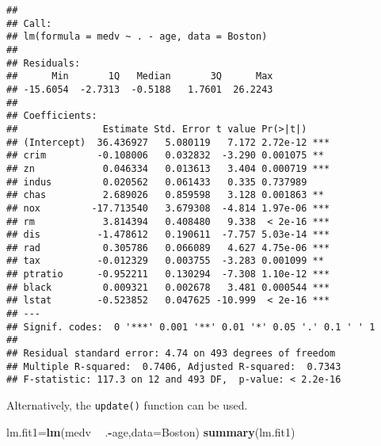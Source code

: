 \documentclass[]{article}
\newenvironment{Shaded}{\begin{snugshade}}{\end{snugshade}}
\newcommand{\KeywordTok}[1]{\textcolor[rgb]{0.13,0.29,0.53}{\textbf{#1}}}
\newcommand{\DataTypeTok}[1]{\textcolor[rgb]{0.13,0.29,0.53}{#1}}
\newcommand{\StringTok}[1]{\textcolor[rgb]{0.31,0.60,0.02}{#1}}
\newcommand{\OperatorTok}[1]{\textcolor[rgb]{0.81,0.36,0.00}{\textbf{#1}}}
\newcommand{\NormalTok}[1]{#1}
\begin{document}
\begin{verbatim}
## 
## Call:
## lm(formula = medv ~ . - age, data = Boston)
## 
## Residuals:
##      Min       1Q   Median       3Q      Max 
## -15.6054  -2.7313  -0.5188   1.7601  26.2243 
## 
## Coefficients:
##               Estimate Std. Error t value Pr(>|t|)    
## (Intercept)  36.436927   5.080119   7.172 2.72e-12 ***
## crim         -0.108006   0.032832  -3.290 0.001075 ** 
## zn            0.046334   0.013613   3.404 0.000719 ***
## indus         0.020562   0.061433   0.335 0.737989    
## chas          2.689026   0.859598   3.128 0.001863 ** 
## nox         -17.713540   3.679308  -4.814 1.97e-06 ***
## rm            3.814394   0.408480   9.338  < 2e-16 ***
## dis          -1.478612   0.190611  -7.757 5.03e-14 ***
## rad           0.305786   0.066089   4.627 4.75e-06 ***
## tax          -0.012329   0.003755  -3.283 0.001099 ** 
## ptratio      -0.952211   0.130294  -7.308 1.10e-12 ***
## black         0.009321   0.002678   3.481 0.000544 ***
## lstat        -0.523852   0.047625 -10.999  < 2e-16 ***
## ---
## Signif. codes:  0 '***' 0.001 '**' 0.01 '*' 0.05 '.' 0.1 ' ' 1
## 
## Residual standard error: 4.74 on 493 degrees of freedom
## Multiple R-squared:  0.7406, Adjusted R-squared:  0.7343 
## F-statistic: 117.3 on 12 and 493 DF,  p-value: < 2.2e-16
\end{verbatim}

Alternatively, the \texttt{update()} function can be used.

\begin{Shaded}
\begin{Highlighting}[]
\NormalTok{lm.fit1=}\KeywordTok{lm}\NormalTok{(medv }\OperatorTok{~}\StringTok{ }\NormalTok{.}\OperatorTok{-}\NormalTok{age,}\DataTypeTok{data=}\NormalTok{Boston) }
\KeywordTok{summary}\NormalTok{(lm.fit1)}
\end{Highlighting}
\end{Shaded}
\end{document}
